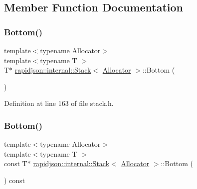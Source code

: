\subsection{Member Function Documentation}
\mbox{\label{classrapidjson_1_1internal_1_1_stack_a0855652d8ebbaa8a9299bfcdf81c47c2}} 
\subsubsection{\texorpdfstring{Bottom()}{Bottom()}\hspace{0.1cm}{\footnotesize\ttfamily [1/2]}}
{\footnotesize\ttfamily template$<$typename Allocator$>$ \\
template$<$typename T $>$ \\
T$\ast$ \mbox{\hyperlink{classrapidjson_1_1internal_1_1_stack}{rapidjson\+::internal\+::\+Stack}}$<$ \mbox{\hyperlink{classrapidjson_1_1_allocator}{Allocator}} $>$\+::Bottom (\begin{DoxyParamCaption}{ }\end{DoxyParamCaption})}



Definition at line 163 of file stack.\+h.


\begin{DoxyCode}{0}

\end{DoxyCode}
\mbox{\label{classrapidjson_1_1internal_1_1_stack_a13ee4775d8febba763b67dc8114beaa5}} 
\subsubsection{\texorpdfstring{Bottom()}{Bottom()}\hspace{0.1cm}{\footnotesize\ttfamily [2/2]}}
{\footnotesize\ttfamily template$<$typename Allocator$>$ \\
template$<$typename T $>$ \\
const T$\ast$ \mbox{\hyperlink{classrapidjson_1_1internal_1_1_stack}{rapidjson\+::internal\+::\+Stack}}$<$ \mbox{\hyperlink{classrapidjson_1_1_allocator}{Allocator}} $>$\+::Bottom (\begin{DoxyParamCaption}{ }\end{DoxyParamCaption}) const}



